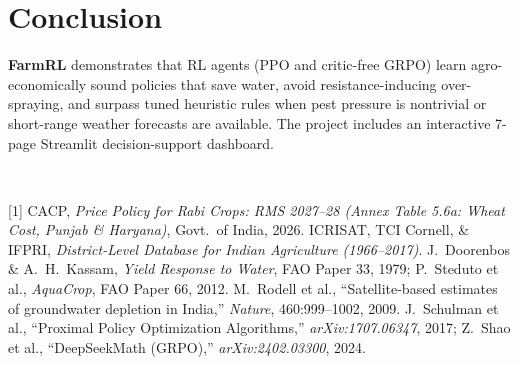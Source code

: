 \documentclass[10pt,twocolumn]{article}
\begin{document}
\section{Conclusion}
\textbf{FarmRL} demonstrates that RL agents (PPO and critic-free GRPO) learn agro-economically sound policies that save water, avoid resistance-inducing over-spraying, and surpass tuned heuristic rules when pest pressure is nontrivial or short-range weather forecasts are available. The project includes an interactive 7-page Streamlit decision-support dashboard.

\vspace{2pt}
\\[1pt]
{\scriptsize
[1] CACP, \textit{Price Policy for Rabi Crops: RMS 2027--28 (Annex Table 5.6a: Wheat Cost, Punjab \& Haryana)}, Govt.\ of India, 2026. \quad
[2] ICRISAT, TCI Cornell, \& IFPRI, \textit{District-Level Database for Indian Agriculture (1966--2017)}. \quad
[3] J.~Doorenbos \& A.~H.~Kassam, \textit{Yield Response to Water}, FAO Paper 33, 1979; P.~Steduto et al., \textit{AquaCrop}, FAO Paper 66, 2012. \quad
[4] M.~Rodell et al., ``Satellite-based estimates of groundwater depletion in India,'' \textit{Nature}, 460:999--1002, 2009. \quad
[5] J.~Schulman et al., ``Proximal Policy Optimization Algorithms,'' \textit{arXiv:1707.06347}, 2017; Z.~Shao et al., ``DeepSeekMath (GRPO),'' \textit{arXiv:2402.03300}, 2024.\par
}
\end{document}

